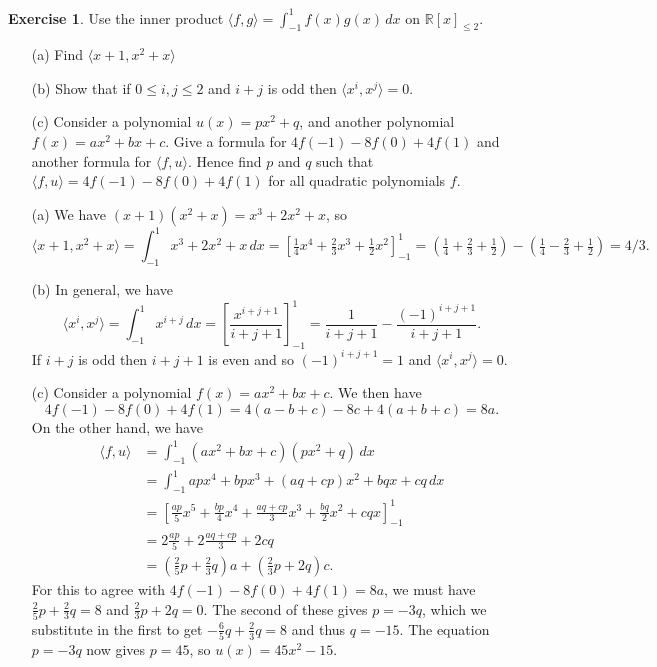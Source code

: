 \documentclass{amsart}
\newcommand{\R}         {{\mathbb{R}}}
\newcommand{\ip}[1]     {\langle #1\rangle}
\renewcommand{\:}       {\colon}
\theoremstyle{definition}
\newtheorem{exercise}{Exercise}[section]
\renewenvironment{solution}{\SolutionAtEnd}{\endSolutionAtEnd}
\begin{document}
\begin{exercise}
 Use the inner product $\ip{f,g}=\int_{-1}^1 f(x)g(x)\,dx$ on
 $\R[x]_{\leq 2}$.
 \begin{itemize}
  \item[(a)] Find $\ip{x+1,x^2+x}$
  \item[(b)] Show that if $0\leq i,j\leq 2$ and $i+j$ is odd then
   $\ip{x^i,x^j}=0$.
  \item[(c)] Consider a polynomial $u(x)=px^2+q$, and another
   polynomial $f(x)=ax^2+bx+c$.  Give a formula for
   $4f(-1)-8f(0)+4f(1)$ and another formula for $\ip{f,u}$.  Hence
   find $p$ and $q$ such that $\ip{f,u}=4f(-1)-8f(0)+4f(1)$ for all
   quadratic polynomials $f$.
 \end{itemize}
\end{exercise}
\begin{solution}
 \begin{itemize}
  \item[(a)] We have $(x+1)(x^2+x)=x^3+2x^2+x$, so 
   \[ \ip{x+1,x^2+x}=\int_{-1}^1 x^3+2x^2+x\,dx = 
       \left[ \tfrac{1}{4}x^4 + \tfrac{2}{3}x^3 +
        \tfrac{1}{2}x^2 \right]_{-1}^1 = 
       (\tfrac{1}{4}+\tfrac{2}{3}+\tfrac{1}{2}) - 
       (\tfrac{1}{4}-\tfrac{2}{3}+\tfrac{1}{2}) = 4/3.
   \]
  \item[(b)] In general, we have 
   \[ \ip{x^i,x^j} = \int_{-1}^1 x^{i+j}\,dx = 
       \left[ \frac{x^{i+j+1}}{i+j+1} \right]_{-1}^1 = 
        \frac{1}{i+j+1} - \frac{(-1)^{i+j+1}}{i+j+1}.
   \]
   If $i+j$ is odd then $i+j+1$ is even and so $(-1)^{i+j+1}=1$ and
   $\ip{x^i,x^j}=0$.
  \item[(c)] Consider a polynomial $f(x)=ax^2+bx+c$.  We then have 
   \[ 4f(-1)-8f(0)+4f(1) = 4 (a-b+c) -8c + 4(a+b+c) = 8a. \]
   On the other hand, we have
   \begin{align*}
    \ip{f,u} &= \int_{-1}^1 (ax^2+bx+c)(px^2+q)\,dx \\
     &= \int_{-1}^1 apx^4 + bpx^3+ (aq+cp)x^2 + bqx + cq \, dx \\
     &= \left[ \tfrac{ap}{5} x^5 + \tfrac{bp}{4} x^4 + 
         \tfrac{aq+cp}{3} x^3 + \tfrac{bq}{2} x^2 + cqx \right]_{-1}^1 \\
     &= 2\tfrac{ap}{5} + 2\tfrac{aq+cp}{3} + 2cq \\
     &= (\tfrac{2}{5}p+\tfrac{2}{3}q)a + 
        (\tfrac{2}{3}p+2q)c. 
   \end{align*}
   For this to agree with $4f(-1)-8f(0)+4f(1)=8a$, we must have
   $\tfrac{2}{5}p+\tfrac{2}{3}q=8$ and $\tfrac{2}{3}p+2q=0$.  The
   second of these gives $p=-3q$, which we substitute in the first to
   get $-\tfrac{6}{5}q+\tfrac{2}{3}q=8$ and thus $q=-15$.  The
   equation $p=-3q$ now gives $p=45$, so $u(x)=45x^2-15$.
 \end{itemize}
\end{solution}
\end{document}
